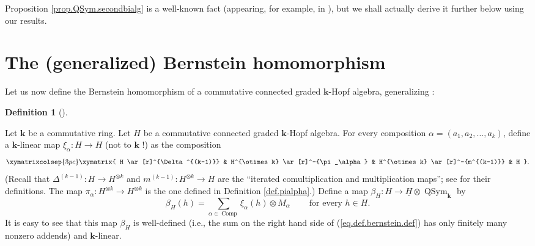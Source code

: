 \documentclass
[numbers=enddot,12pt,final,onecolumn,notitlepage,abstracton]{scrartcl}%
\theoremstyle{definition}
\newtheorem{defi}[theo]{Definition}
\newenvironment{definition}[1][]
{\begin{defi}[#1]\begin{leftbar}}
{\end{leftbar}\end{defi}}
\let\sumnonlimits\sum
\renewcommand{\sum}{\sumnonlimits\limits}
\begin{document}
Proposition \ref{prop.QSym.secondbialg} is a well-known fact (appearing, for
example, in \cite[first paragraph of \S 3]{MalReu95}), but we shall actually
derive it further below using our results.

\section{The (generalized) Bernstein homomorphism}

Let us now define the Bernstein homomorphism of a commutative connected graded
$\mathbf{k}$-Hopf algebra, generalizing \cite[\S 18.24]{HazeWitt}:

\begin{definition}
\label{def.bernstein}Let $\mathbf{k}$ be a commutative ring. Let $H$ be a
commutative connected graded $\mathbf{k}$-Hopf algebra. For every composition
$\alpha=\left(  a_{1},a_{2},\ldots,a_{k}\right)  $, define a $\mathbf{k}%
$-linear map $\xi_{\alpha}:H\rightarrow H$ (not to $\mathbf{k}$ !) as the
composition%
\[%
\xymatrixcolsep{3pc}
\xymatrix{
H \ar[r]^{\Delta^{(k-1)}} & H^{\otimes k} \ar[r]^-{\pi_\alpha} & H^{\otimes k}
\ar[r]^-{m^{(k-1)}} & H
}%
.
\]
(Recall that $\Delta^{\left(  k-1\right)  }:H\rightarrow H^{\otimes k}$ and
$m^{\left(  k-1\right)  }:H^{\otimes k}\rightarrow H$ are the
\textquotedblleft iterated comultiplication and multiplication
maps\textquotedblright; see \cite[\S 1.4]{Reiner} for their definitions. The
map $\pi_{\alpha}:H^{\otimes k}\rightarrow H^{\otimes k}$ is the one defined
in Definition \ref{def.pialpha}.) Define a map $\beta_{H}:H\rightarrow
\underline{H}\otimes\operatorname*{QSym}\nolimits_{\mathbf{k}}$ by%
\begin{equation}
\beta_{H}\left(  h\right)  =\sum_{\alpha\in\operatorname*{Comp}}\xi_{\alpha
}\left(  h\right)  \otimes M_{\alpha}\ \ \ \ \ \ \ \ \ \ \text{for every }h\in
H. \label{eq.def.bernstein.def}%
\end{equation}
It is easy to see that this map $\beta_{H}$ is well-defined (i.e., the sum on
the right hand side of (\ref{eq.def.bernstein.def}) has only finitely many
nonzero addends\footnotemark) and $\mathbf{k}$-linear.
\end{definition}
\end{document}

